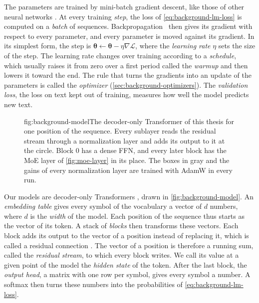 The parameters are trained by mini-batch gradient descent, like those of other neural networks \cite{goodfellow2016deep}. At every training \emph{step}, the loss of \cref{eq:background-lm-loss} is computed on a \emph{batch} of sequences. Backpropagation~\cite{rumelhart1986learning} then gives its gradient with respect to every parameter, and every parameter is moved against its gradient. In its simplest form, the step is $\boldsymbol{\theta} \leftarrow \boldsymbol{\theta} - \eta \nabla \mathcal{L}$, where the \emph{learning rate} $\eta$ sets the size of the step. The learning rate changes over training according to a \emph{schedule}, which usually raises it from zero over a first period called the \emph{warmup} and then lowers it toward the end. The rule that turns the gradients into an update of the parameters is called the \emph{optimizer} (\cref{sec:background-optimizers}). The \emph{validation loss}, the loss on text kept out of training, measures how well the model predicts new text.

\begin{figure}[The decoder-only Transformer]{fig:background-model}{The decoder-only Transformer of this thesis for one position of the sequence. Every sublayer reads the residual stream through a normalization layer and adds its output to it at the circle. Block 0 has a dense FFN, and every later block has the MoE layer of \cref{fig:moe-layer} in its place. The boxes in gray and the gains of every normalization layer are trained with AdamW in every run.}
  
\end{figure}

Our models are decoder-only Transformers \cite{vaswani2017attention, radford2019language}, drawn in \cref{fig:background-model}. An \emph{embedding table} gives every symbol of the vocabulary a vector of $d$ numbers, where $d$ is the \emph{width} of the model. Each position of the sequence thus starts as the vector of its token. A stack of \emph{blocks} then transforms these vectors. Each block adds its output to the vector of a position instead of replacing it, which is called a residual connection \cite{he2016resnet}. The vector of a position is therefore a running sum, called the \emph{residual stream}, to which every block writes. We call its value at a given point of the model the \emph{hidden state} of the token. After the last block, the \emph{output head}, a matrix with one row per symbol, gives every symbol a number. A softmax then turns these numbers into the probabilities of \cref{eq:background-lm-loss}.

